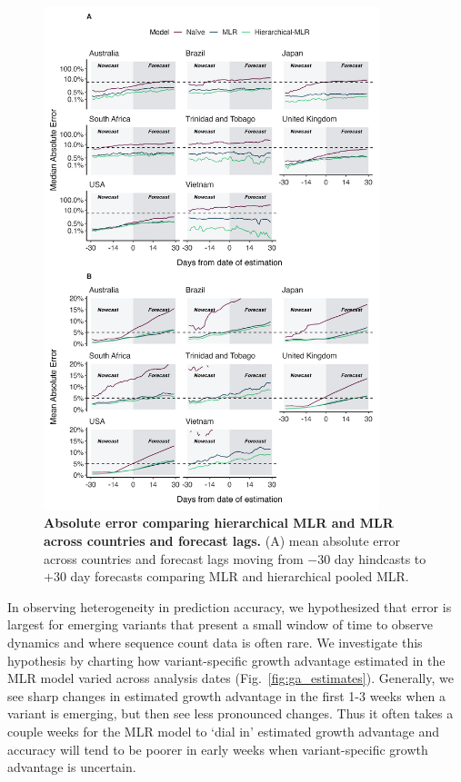 \documentclass[11pt,oneside,letterpaper]{article}
\begin{document}
\begin{figure}[tb!]
	\centering
	\includegraphics[width=0.87\textwidth]{figures/model_comp_PooledMLR.png}
	\caption{\textbf{Absolute error comparing hierarchical MLR and MLR across countries and forecast lags.}
	(A) mean absolute error across countries and forecast lags moving from $-30$ day hindcasts to $+30$ day forecasts comparing MLR and hierarchical pooled MLR.
	}
	\label{fig:model_comp_PooledMLR}
\end{figure}




In observing heterogeneity in prediction accuracy, we hypothesized that error is largest for emerging variants that present a small window of time to observe dynamics and where sequence count data is often rare.
We investigate this hypothesis by charting how variant-specific growth advantage estimated in the MLR model varied across analysis dates (Fig.~\ref{fig:ga_estimates}).
Generally, we see sharp changes in estimated growth advantage in the first 1-3 weeks when a variant is emerging, but then see less pronounced changes.
Thus it often takes a couple weeks for the MLR model to `dial in' estimated growth advantage and accuracy will tend to be poorer in early weeks when variant-specific growth advantage is uncertain.
\end{document}
